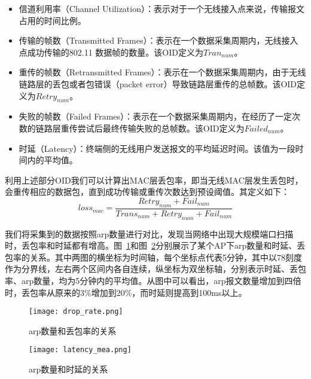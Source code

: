\begin{itemize}
  \item 信道利用率（Channel Utilization）：表示对于一个无线接入点来说，传输报文占用的时间比例。
  \item 传输的帧数（Transmitted Frames）：表示在一个数据采集周期内，无线接入点成功传输的802.11 数据帧的数量。该OID定义为$Tran_{num}$。
  \item 重传的帧数（Retransmitted Frames）：表示在一个数据采集周期内，由于无线链路层的丢包或者包错误（packet error）导致链路层重传的总帧数。该OID定义为$Retry_{num}$。
  \item 失败的帧数（Failed Frames）：表示在一个数据采集周期内，在经历了一定次数的链路层重传尝试后最终传输失败的总帧数。该OID定义为$Failed_{num}$。
  \item 时延（Latency）：终端侧的无线用户发送报文的平均延迟时间。该值为一段时间内的平均值。
\end{itemize}
利用上述部分OID我们可以计算出MAC层丢包率，即当无线MAC层发生丢包时，会重传相应的数据包，直到成功传输或重传次数达到预设阈值。其定义如下：
\begin{equation}
  {loss}_{mac} = \frac{{Retry}_{num} + {Fail}_{num}}{{Trans}_{num} + {Retry}_{num} + {Fail}_{num}}
\end{equation}

我们将采集到的数据按照arp数量进行对比，发现当网络中出现大规模端口扫描时，丢包率和时延都有增高。图~\ref{fig:丢包}和图~\ref{fig:时延}分别展示了某个AP下arp数量和时延、丢包率的关系。其中两图的横坐标为时间轴，每个坐标点代表5分钟，其中以78刻度作为分界线，左右两个区间内各自连续，纵坐标为双坐标轴，分别表示时延、丢包率、arp数量，均为5分钟内的平均值。从图中可以看出，arp报文数量增加到四倍时，丢包率从原来的3\%增加到20\%，而时延则提高到100ms以上。

\begin{figure}
  \centering
  \texttt{[image: drop\_rate.png]}
  \caption{arp数量和丢包率的关系}
  \label{fig:丢包}
\end{figure}

\begin{figure}
  \centering
  \texttt{[image: latency\_mea.png]}
  \caption{arp数量和时延的关系}
  \label{fig:时延}
\end{figure}
